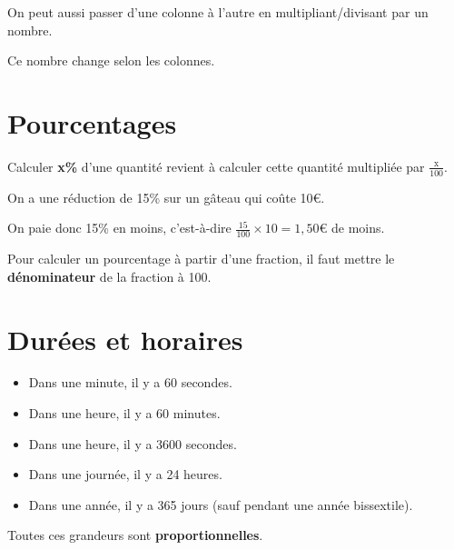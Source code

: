 \documentclass[a4paper,11pt]{article}
\begin{document}
\begin{greybox}[frametitle={Remarque}]
	On peut aussi passer d'une colonne à l'autre en multipliant/divisant par un nombre.

	Ce nombre change selon les colonnes.
\end{greybox}

\section{Pourcentages}

\begin{cours}
	Calculer \textbf{x\%} d'une quantité revient à calculer cette quantité multipliée par $\frac{\text{x}}{100}$.
\end{cours}

\begin{exemple}
	On a une réduction de 15\% sur un gâteau qui coûte 10€.

	On paie donc 15\% en moins, c'est-à-dire $\frac{15}{100} × 10 = 1,50€$ de moins.
\end{exemple}

\begin{cours}
	Pour calculer un pourcentage à partir d'une fraction, il faut mettre le \textbf{dénominateur} de la fraction à 100.
\end{cours}

\section{Durées et horaires}

\begin{cours}[Durées]
	\begin{itemize}
		\item Dans une minute, il y a 60 secondes.
		\item Dans une heure, il y a 60 minutes.
		\item Dans une heure, il y a 3600 secondes.
		\item Dans une journée, il y a 24 heures.
		\item Dans une année, il y a 365 jours (sauf pendant une année bissextile).
	\end{itemize} \vspace{1em}

	Toutes ces grandeurs sont \textbf{proportionnelles}.
\end{cours}
\end{document}
